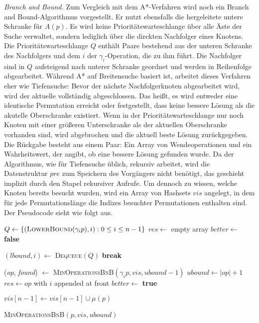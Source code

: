 \documentclass[a4paper, 11pt, ngerman]{article}
\begin{document}
\noindent \emph{Branch and Bound.} Zum Vergleich mit dem A*-Verfahren wird noch ein Branch and Bound-Algorithmus vorgestellt. Er nutzt ebensfalls die hergeleitete untere Schranke für $A(p)$. Es wird keine Prioritätswarteschlange über alle Äste der Suche verwaltet, sondern lediglich über die direkten Nachfolger eines Knotens. Die Prioritätswarteschlange $Q$ enthält Paare bestehend aus der unteren Schranke des Nachfolgers und dem $i$ der $\gamma_i$-Operation, die zu ihm führt. Die Nachfolger sind in $Q$ aufsteigend nach unterer Schranke geordnet und werden in Reihenfolge abgearbeitet. Während A* auf Breitensuche basiert ist, arbeitet dieses Verfahren eher wie Tiefensuche: Bevor der nächste Nachfolgerknoten abgearbeitet wird, wird der aktuelle vollständig abgeschlossen. Das heißt, es wird entweder eine identische Permutation erreicht oder festgestellt, dass keine bessere Lösung als die akutelle Oberschranke existiert. Wenn in der Prioritätswarteschlange nur noch Knoten mit einer größeren Unterschranke als der aktuellen Oberschranke vorhanden sind, wird abgebrochen und die aktuell beste Lösung zurückgegeben. Die Rückgabe besteht aus einem Paar: Ein Array von Wendeoperationen und ein Wahrheitswert, der angibt, ob eine bessere Lösung gefunden wurde. Da der Algorithmus, wie für Tiefensuche üblich, rekursiv arbeitet, wird die Datenstruktur $pre$ zum Speichern des Vorgängers nicht benötigt, das geschieht implizit durch den Stapel rekursiver Aufrufe. Um dennoch zu wissen, welche Knoten bereits besucht wurden, wird ein Array von Hashsets $vis$ angelegt, in dem für jede Permutationslänge die Indizes besuchter Permutationen enthalten sind. Der Pseudocode sieht wie folgt aus.

\begin{algorithm}
    {
         \;
    }
    {
         \;
    }

    $Q \gets \{(\textsc{LowerBound}(\gamma_i p), i) : 0 \le i \le n - 1\}$ \;
    $res \gets$ empty array \;
    $better \gets$ \textbf{false} \;

    {
        $(lbound, i) \gets$ \textsc{Dequeue}$(Q)$ \;
        {
            \textbf{break} \;
        }

        (\emph{op}, \emph{found}) $\gets$ \textsc{MinOperationsBnB}$(\gamma_i p, vis, ubound - 1)$ \;
        {
            $ubound \gets |op| + 1$ \;
            $res \gets op$ with $i$ appended at front \;
            $better \gets$ \textbf{true} \;
        }
    }

    $vis[n - 1] \gets vis[n - 1] \cup \mu(p)$ \;
     \;

    \caption{\textsc{MinOperationsBnB}$(p, vis, ubound)$}
\end{algorithm}
\end{document}

